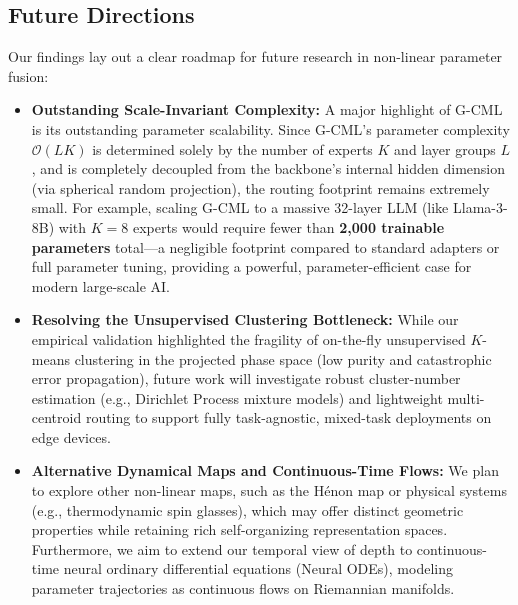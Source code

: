 \subsection{Future Directions}
Our findings lay out a clear roadmap for future research in non-linear parameter fusion:
\begin{itemize}
    \item \textbf{Outstanding Scale-Invariant Complexity:} A major highlight of G-CML is its outstanding parameter scalability. Since G-CML's parameter complexity $\mathcal{O}(LK)$ is determined solely by the number of experts $K$ and layer groups $L$, and is completely decoupled from the backbone's internal hidden dimension (via spherical random projection), the routing footprint remains extremely small. For example, scaling G-CML to a massive 32-layer LLM (like Llama-3-8B) with $K=8$ experts would require fewer than \textbf{2,000 trainable parameters} total—a negligible footprint compared to standard adapters or full parameter tuning, providing a powerful, parameter-efficient case for modern large-scale AI.
    \item \textbf{Resolving the Unsupervised Clustering Bottleneck:} While our empirical validation highlighted the fragility of on-the-fly unsupervised $K$-means clustering in the projected phase space (low purity and catastrophic error propagation), future work will investigate robust cluster-number estimation (e.g., Dirichlet Process mixture models) and lightweight multi-centroid routing to support fully task-agnostic, mixed-task deployments on edge devices.
    \item \textbf{Alternative Dynamical Maps and Continuous-Time Flows:} We plan to explore other non-linear maps, such as the H{\'e}non map or physical systems (e.g., thermodynamic spin glasses), which may offer distinct geometric properties while retaining rich self-organizing representation spaces. Furthermore, we aim to extend our temporal view of depth to continuous-time neural ordinary differential equations (Neural ODEs), modeling parameter trajectories as continuous flows on Riemannian manifolds.
\end{itemize}
